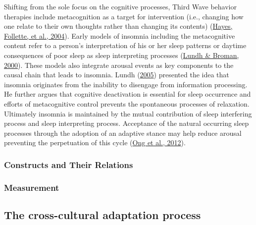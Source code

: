 \documentclass[
  ,doc,11pt, twoside,floatsintext]{apa6}
\begin{document}
Shifting from the sole focus on the cognitive processes, Third Wave behavior therapies include metacognition as a target for intervention (i.e., changing how one relate to their own thoughts rather than changing its contents) (\protect\hyperlink{ref-hayes2004mindfulness}{Hayes, Follette, et al., 2004}). Early models of insomnia including the metacognitive content refer to a person's interpretation of his or her sleep patterns or daytime consequences of poor sleep as sleep interpreting processes (\protect\hyperlink{ref-lundh2000}{Lundh \& Broman, 2000}). These models also integrate arousal events as key components to the causal chain that leads to insomnia. Lundh (\protect\hyperlink{ref-lundh2005}{2005}) presented the idea that insomnia originates from the inability to disengage from information processing. He further argues that cognitive deactivation is essential for sleep occurrence and efforts of metacognitive control prevents the spontaneous processes of relaxation. Ultimately insomnia is maintained by the mutual contribution of sleep interfering process and sleep interpreting process. Acceptance of the natural occurring sleep processes through the adoption of an adaptive stance may help reduce arousal preventing the perpetuation of this cycle (\protect\hyperlink{ref-ong2012}{Ong et al., 2012}).

\hypertarget{constructs-and-their-relations-1}{%
\subsubsection{Constructs and Their Relations}\label{constructs-and-their-relations-1}}

\hypertarget{measurement-1}{%
\subsubsection{Measurement}\label{measurement-1}}

\hypertarget{the-cross-cultural-adaptation-process}{%
\subsection{The cross-cultural adaptation process}\label{the-cross-cultural-adaptation-process}}
\end{document}

